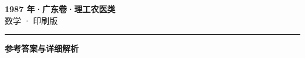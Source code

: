 \documentclass[zihao=5, a4paper]{ctexart}
\begin{document}
\begin{center}
  {\Large\bfseries 1987 年·广东卷·理工农医类}\\[4pt]
  {\large 数学 · 印刷版}
\end{center}
\medskip
{}

\par\bigskip\hrule\bigskip
{}
\begin{center}{\large\bfseries 参考答案与详细解析}\end{center}
\smallskip

\end{document}
